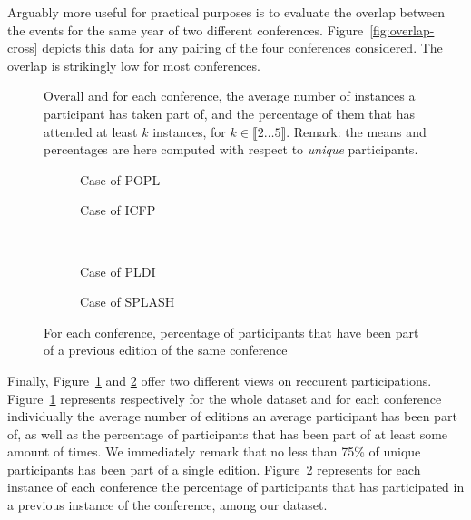 Arguably more useful for practical purposes is to evaluate the overlap 
between the events for the same year of two different conferences.
Figure~\ref{fig:overlap-cross} depicts this data for any pairing of the four
conferences considered. The overlap is strikingly low for most conferences.

\begin{figure}
\caption{Overall and for each conference, the average number of instances a
  participant has taken part of, and the percentage of them that has
  attended at least $k$ instances, for $k\in\llbracket 2 \dots 5
  \rrbracket$. Remark: the means and percentages are here computed with
  respect to \emph{unique} participants.  }
\label{fig:reccurent}
\end{figure}

\begin{figure}
  \centering
  \begin{subfigure}[b]{0.4\textwidth}
    \centering
    \caption{Case of POPL}
  \end{subfigure}
  \begin{subfigure}[b]{0.4\textwidth}
    \centering
    \caption{Case of ICFP}
  \end{subfigure}
  \\
  \begin{subfigure}[b]{0.4\textwidth}
    \centering
    \caption{Case of PLDI}
  \end{subfigure}
  \begin{subfigure}[b]{0.4\textwidth}
    \centering
    \caption{Case of SPLASH}
  \end{subfigure}
  \caption{For each conference, percentage of participants that have been
    part of a previous edition of the same conference }
  \label{fig:old-timers}
\end{figure}

Finally, Figure~\ref{fig:reccurent} and \ref{fig:old-timers} offer two different views on reccurent participations. Figure~\ref{fig:reccurent} represents respectively for the whole dataset and for each conference individually the average number of editions an average participant has been part of, as well as the percentage of participants that has been part of at least some amount of times. We immediately remark that no less than 75\% of unique participants has been part of a single edition.
Figure~\ref{fig:old-timers} represents for each instance of each conference the percentage of participants that has participated in a previous instance of the conference, among our dataset.

